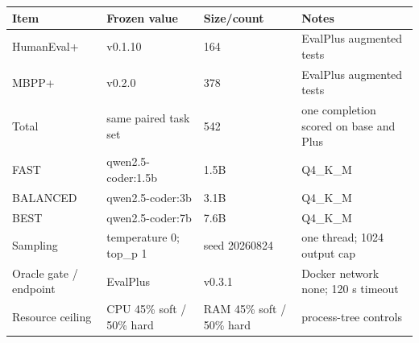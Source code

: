 \begin{tabular}{llll}
\toprule
Item & Frozen value & Size/count & Notes \\
\midrule
HumanEval+ & v0.1.10 & 164 & EvalPlus augmented tests \\
MBPP+ & v0.2.0 & 378 & EvalPlus augmented tests \\
Total & same paired task set & 542 & one completion scored on base and Plus \\
FAST & qwen2.5-coder:1.5b & 1.5B & Q4\_K\_M \\
BALANCED & qwen2.5-coder:3b & 3.1B & Q4\_K\_M \\
BEST & qwen2.5-coder:7b & 7.6B & Q4\_K\_M \\
Sampling & temperature 0; top\_p 1 & seed 20260824 & one thread; 1024 output cap \\
Oracle gate / endpoint & EvalPlus & v0.3.1 & Docker network none; 120 s timeout \\
Resource ceiling & CPU 45\% soft / 50\% hard & RAM 45\% soft / 50\% hard & process-tree controls \\
\bottomrule
\end{tabular}
